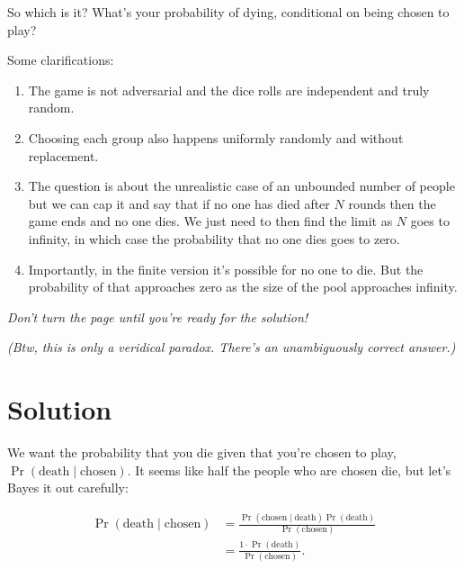 \documentclass[article,twocolumn]{memoir}
\begin{document}
\vspace{2em}

So which is it? 
What's your probability of dying, conditional on being chosen to play?

\newpage

Some clarifications:

\begin{enumerate}
\item The game is not adversarial and the dice rolls are independent and truly random.
\item Choosing each group also happens uniformly randomly and without replacement.
\item The question is about the unrealistic case of an unbounded number of people but we can cap it and say that if no one has died after $N$ rounds then the game ends and no one dies. 
We just need to then find the limit as $N$ goes to infinity, in which case the probability that no one dies goes to zero.
\item Importantly, in the finite version it's possible for no one to die. 
But the probability of that approaches zero as the size of the pool approaches infinity.
\end{enumerate}

\vspace{2em}
\noindent
\emph{Don't turn the page until you're ready for the solution!}

\vspace{2em}
\noindent
\emph{(Btw, this is only a veridical paradox. There's an unambiguously correct answer.)}

\newpage

\chapter*{Solution}

We want the probability that you die given that you're chosen to play, 
$\Pr(\text{death} \mid \text{chosen})$.
It seems like half the people who are chosen die, but let's Bayes it out carefully:

\begin{equation*}
\begin{split}
\Pr(\text{death} \mid \text{chosen}) & =
\frac{\Pr(\text{chosen} \mid \text{death}) \Pr(\text{death})}{\Pr(\text{chosen})} \\
& = \frac{1\cdot\Pr(\text{death})}{\Pr(\text{chosen})}.
\end{split}
\end{equation*}
\end{document}
